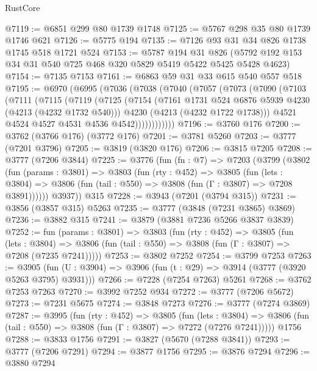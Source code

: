 \begin{lexlean}{RustCore}
\begin{coremodule}
@7119 := @6851 @299 @80 @1739 @1748
@7125 := @5767 @298 @35 @80 @1739 @1746 @621
@7126 := @5775 @194
@7135 := @7126 @93 @31 @34 @826 @1738 @1745 @518 @1721 @524
@7153 := @5787
    @194
    @31
    @826
    (@5792 @192 @153 @34 @31 @540 @725 @468 @320 @5829 @5419 @5422 @5425 @5428 @4623)
@7154 := @7135 @7153
@7161 := @6863 @59 @31 @33 @615 @540 @557 @518
@7195 := @6970
    (@6995
      (@7036
        (@7038
          (@7040
            (@7057
              (@7073
                (@7090
                  (@7103
                    (@7111
                      (@7115
                        (@7119
                          (@7125
                            (@7154
                              (@7161 @1731 @524 @6876 @5939 @4230 (@4213 (@4232 @1732 @540)))
                              @4230
                              (@4213 (@4232 @1722 @1738)))
                            @4521
                            @4524
                            @4527
                            @4531
                            @4536
                            @4542))))))))))))
@7196 := @3760 @176
@7200 := @3762 (@3766 @176) (@3772 @176)
@7201 := @3781 @5260
@7203 := @3777 (@7201 @3796)
@7205 := @3819 (@3820 @176)
@7206 := @3815 @7205
@7208 := @3777 (@7206 @3844)
@7225 := @3776
    (fun (fn : @7) =>
    @7203
      (@3799
        (@3802
          (fun (params : @3801) =>
          @3803
            (fun (rty : @452) =>
            @3805
              (fun (lets : @3804) =>
              @3806 (fun (tail : @550) => @3808 (fun (Γ : @3807) => @7208 @3891))))))
        @3937))
    @315
@7228 := @3943 (@7201 (@3794 @315))
@7231 := @3856 (@3857 @315) @5263
@7235 := @3777 (@3848 (@7231 @3865) @3869)
@7236 := @3882 @315
@7241 := @3879 (@3881 @7236 @5266 @3837 @3839)
@7252 := fun (params : @3801) =>
  @3803
    (fun (rty : @452) =>
    @3805
      (fun (lets : @3804) =>
      @3806 (fun (tail : @550) => @3808 (fun (Γ : @3807) => @7208 (@7235 @7241)))))
@7253 := @3802 @7252
@7254 := @3799 @7253
@7263 := @3905 (fun (U : @3904) => @3906 (fun (t : @29) => @3914 (@3777 (@3920 @5263 @3795) @3931)))
@7266 := @7228 (@7254 @7263) @5261
@7268 := @3762 @7253 @7263
@7270 := @3992 @7252 @934
@7272 := @3777 (@7206 @5672)
@7273 := @7231 @5675
@7274 := @3848 @7273
@7276 := @3777 (@7274 @3869)
@7287 := @3995
    (fun (rty : @452) =>
    @3805
      (fun (lets : @3804) =>
      @3806 (fun (tail : @550) => @3808 (fun (Γ : @3807) => @7272 (@7276 @7241)))))
    @1756
@7288 := @3833 @1756
@7291 := @3827 (@5670 (@7288 @3841))
@7293 := @3777 (@7206 @7291)
@7294 := @3877 @1756
@7295 := @3876 @7294
@7296 := @3880 @7294

\end{coremodule}
\end{lexlean}
